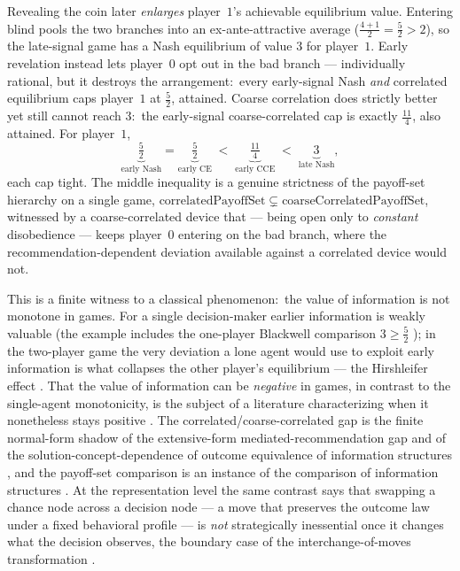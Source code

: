 Revealing the coin later \emph{enlarges} player~$1$'s achievable
equilibrium value.  Entering blind pools the two branches into an
ex-ante-attractive average ($\tfrac{4+1}{2} = \tfrac52 > 2$), so the
late-signal game has a Nash equilibrium of value $3$ for player~$1$.
Early revelation instead lets player~$0$ opt out in the bad branch —
individually rational, but it destroys the arrangement:\ every
early-signal Nash \emph{and} correlated equilibrium caps player~$1$ at
$\tfrac52$, attained.  Coarse correlation does strictly better yet still
cannot reach $3$:\ the early-signal coarse-correlated cap is exactly
$\tfrac{11}{4}$, also attained.  For player~$1$,
\[
  \underbrace{\tfrac52}_{\text{early Nash}}
  = \underbrace{\tfrac52}_{\text{early CE}}
  \;<\; \underbrace{\tfrac{11}{4}}_{\text{early CCE}}
  \;<\; \underbrace{3}_{\text{late Nash}},
\]
each cap tight.  The middle inequality is a genuine strictness of the
payoff-set hierarchy on a single game,
$\mathrm{correlatedPayoffSet} \subsetneq
\mathrm{coarseCorrelatedPayoffSet}$, witnessed by a coarse-correlated
device that — being open only to \emph{constant} disobedience — keeps
player~$0$ entering on the bad branch, where the
recommendation-dependent deviation available against a correlated device
would not.

This is a finite witness to a classical phenomenon:\ the value of
information is not monotone in games.  For a single decision-maker
earlier information is weakly valuable (the example includes the
one-player Blackwell comparison $3 \ge \tfrac52$
\citep{Blackwell1953}); in the two-player game the very deviation a lone
agent would use to exploit early information is what collapses the other
player's equilibrium — the Hirshleifer effect \citep{Hirshleifer1971}.
That the value of information can be \emph{negative} in games, in
contrast to the single-agent monotonicity, is the subject of a
literature characterizing when it nonetheless stays positive
\citep{Bassan2003}.  The correlated/coarse-correlated gap is the finite
normal-form shadow of the extensive-form mediated-recommendation gap
\citep{vonStengelForges2008} and of the solution-concept-dependence of
outcome equivalence of information structures
\citep{LehrerRosenbergShmaya2010, LehrerRosenbergShmaya2013}, and the
payoff-set comparison is an instance of the comparison of information
structures \citep{BergemannMorris2016}.  At the representation level the same
contrast says that swapping a chance node across a decision node — a
move that preserves the outcome law under a fixed behavioral profile —
is \emph{not} strategically inessential once it changes what the
decision observes, the boundary case of the interchange-of-moves
transformation \citep{Thompson1952, ElmesReny1994}.

